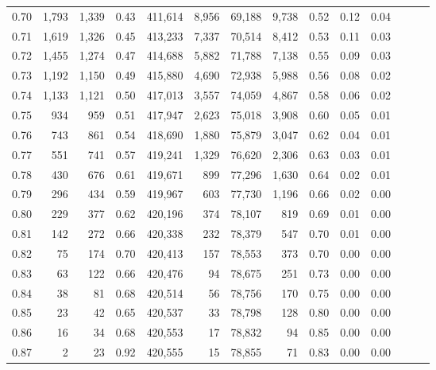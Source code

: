\begin{tabular}{rrrrrrrrrrrrrr}
0.70 &   1,793 &  1,339 &  0.43 &  411,614 &    8,956 &  69,188 &   9,738 &  0.52 &  0.12 &      0.04 \\
0.71 &   1,619 &  1,326 &  0.45 &  413,233 &    7,337 &  70,514 &   8,412 &  0.53 &  0.11 &      0.03 \\
0.72 &   1,455 &  1,274 &  0.47 &  414,688 &    5,882 &  71,788 &   7,138 &  0.55 &  0.09 &      0.03 \\
0.73 &   1,192 &  1,150 &  0.49 &  415,880 &    4,690 &  72,938 &   5,988 &  0.56 &  0.08 &      0.02 \\
0.74 &   1,133 &  1,121 &  0.50 &  417,013 &    3,557 &  74,059 &   4,867 &  0.58 &  0.06 &      0.02 \\
0.75 &     934 &    959 &  0.51 &  417,947 &    2,623 &  75,018 &   3,908 &  0.60 &  0.05 &      0.01 \\
0.76 &     743 &    861 &  0.54 &  418,690 &    1,880 &  75,879 &   3,047 &  0.62 &  0.04 &      0.01 \\
0.77 &     551 &    741 &  0.57 &  419,241 &    1,329 &  76,620 &   2,306 &  0.63 &  0.03 &      0.01 \\
0.78 &     430 &    676 &  0.61 &  419,671 &      899 &  77,296 &   1,630 &  0.64 &  0.02 &      0.01 \\
0.79 &     296 &    434 &  0.59 &  419,967 &      603 &  77,730 &   1,196 &  0.66 &  0.02 &      0.00 \\
0.80 &     229 &    377 &  0.62 &  420,196 &      374 &  78,107 &     819 &  0.69 &  0.01 &      0.00 \\
0.81 &     142 &    272 &  0.66 &  420,338 &      232 &  78,379 &     547 &  0.70 &  0.01 &      0.00 \\
0.82 &      75 &    174 &  0.70 &  420,413 &      157 &  78,553 &     373 &  0.70 &  0.00 &      0.00 \\
0.83 &      63 &    122 &  0.66 &  420,476 &       94 &  78,675 &     251 &  0.73 &  0.00 &      0.00 \\
0.84 &      38 &     81 &  0.68 &  420,514 &       56 &  78,756 &     170 &  0.75 &  0.00 &      0.00 \\
0.85 &      23 &     42 &  0.65 &  420,537 &       33 &  78,798 &     128 &  0.80 &  0.00 &      0.00 \\
0.86 &      16 &     34 &  0.68 &  420,553 &       17 &  78,832 &      94 &  0.85 &  0.00 &      0.00 \\
0.87 &       2 &     23 &  0.92 &  420,555 &       15 &  78,855 &      71 &  0.83 &  0.00 &      0.00 \\

\end{tabular}
